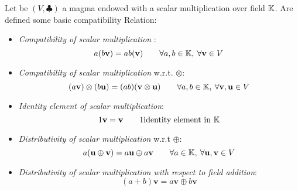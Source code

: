 \documentclass[a4paper,12pt]{scrartcl}    %
\newcommand{\OpA}{\otimes}
\newcommand{\OpB}{\oplus}
\begin{document}
\begin{landscape}
\begin{minipage}[c][\textheight]{0.30 \linewidth}
			Let be $(V, \clubsuit)$ a magma endowed with a scalar multiplication over field $\mathbb{K}$.
			Are defined some basic compatibility  Relation:
			\begin{itemize}
			\item \emph{Compatibility of scalar multiplication} :
				\begin{equation}\label{scalarmulti}
					a ( b \mathbf{v} ) = ab (\mathbf{v}) \qquad \forall a,b \in \mathbb{K},\: \forall \mathbf{v} \in V
				\end{equation}
			\item \emph{Compatibility of scalar multiplication} w.r.t. $\OpA$:
				\begin{equation}\label{scalarcompat}
					 (a \mathbf{v} ) \OpA (b \mathbf{u)}= (ab) (\mathbf{v}\OpA \mathbf{u}) \qquad 
					 \forall a,b \in \KField,\: \forall \mathbf{v},\mathbf{u} \in V
				\end{equation}
			\item \emph{Identity element of scalar multiplication}:
				\begin{equation}\label{scalaridentity}
					1 \mathbf{v} = \mathbf{v}  \qquad 1 \textrm{identity element in $\mathbb{K}$}
				\end{equation}
			\item \emph{Distributivity of scalar multiplication} w.r.t $\OpB$:
				\begin{equation}\label{scalarDistributivityA}
					a ( \mathbf{u} \OpB \mathbf{v} ) = a \mathbf{u} \OpB a \mathbf{v} \qquad \forall a \in\KField,\: \forall \mathbf{u},\mathbf{v}\in V
				\end{equation}
			\item \emph{Distributivity of scalar multiplication with respect to field addition}:
				\begin{equation}\label{scalarDistributivityB}
					(a +b ) \mathbf{v} = a  \mathbf{v}  \OpB  b \mathbf{v}
				\end{equation}
			\end{itemize}
			

\end{minipage}
\end{landscape}
\end{document}
